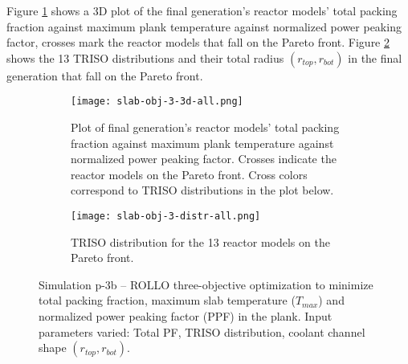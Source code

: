 Figure \ref{fig:slab-obj-3-3d-all} shows a 3D plot of the final generation's reactor 
models' total packing fraction against maximum plank temperature against normalized
power peaking factor, crosses mark the reactor models that fall on the Pareto front.
Figure \ref{fig:slab-obj-3-distr-all} shows the 13 TRISO distributions and their
total radius $(r_{top}, r_{bot})$ in the final generation that fall on the Pareto 
front. 
\begin{figure}[htbp]
    \begin{subfigure}{\textwidth}
        \centering
        \texttt{[image: slab-obj-3-3d-all.png]}
        \caption{Plot of final generation's reactor models' total packing fraction against maximum plank 
        temperature against normalized power peaking factor. Crosses indicate the reactor models on the 
        Pareto front. Cross colors correspond to TRISO distributions in the plot below.}
        \label{fig:slab-obj-3-3d-all} 
    \end{subfigure}
    \begin{subfigure}{\textwidth}
        \texttt{[image: slab-obj-3-distr-all.png]}
        \caption{TRISO distribution for the 13 reactor models on the Pareto front.}
        \label{fig:slab-obj-3-distr-all} 
    \end{subfigure}
    \caption{Simulation p-3b -- ROLLO three-objective optimization to minimize total packing fraction, 
    maximum slab temperature ($T_{max}$) and normalized power peaking factor (PPF) in the plank. 
    Input parameters varied: Total PF, TRISO distribution, 
    coolant channel shape $(r_{top}, r_{bot})$.}
    \label{fig:slab-obj-3-all}
\end{figure}

